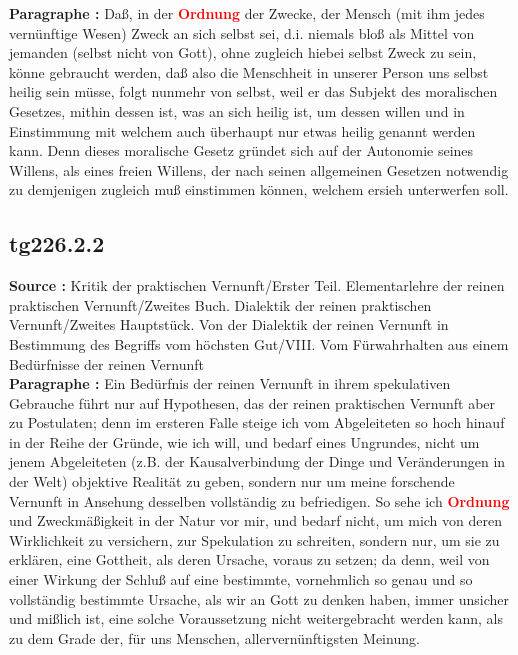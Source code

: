 \documentclass[a4paper,12pt,twoside]{book}
\newcommand{\match}[1]{\textcolor{red}{\textbf{#1}}}
\begin{document}
	\noindent\textbf{Paragraphe : }Daß, in der \match{Ordnung} der Zwecke, der Mensch (mit ihm jedes vernünftige Wesen) Zweck an sich selbst sei, d.i. niemals bloß als Mittel von jemanden (selbst nicht von Gott), ohne zugleich hiebei selbst Zweck zu sein, könne gebraucht werden, daß also die Menschheit in unserer Person uns selbst heilig sein müsse, folgt nunmehr von selbst, weil er das Subjekt des moralischen Gesetzes, mithin dessen  ist, was an sich heilig ist, um dessen willen und in Einstimmung mit welchem auch überhaupt nur etwas heilig genannt werden kann. Denn dieses moralische Gesetz gründet sich auf der Autonomie seines Willens, als eines freien Willens, der nach seinen allgemeinen Gesetzen notwendig zu demjenigen zugleich muß einstimmen können, welchem ersieh unterwerfen soll. 
	
	\subsection*{tg226.2.2} 
	\textbf{Source : }Kritik der praktischen Vernunft/Erster Teil. Elementarlehre der reinen praktischen Vernunft/Zweites Buch. Dialektik der reinen praktischen Vernunft/Zweites Hauptstück. Von der Dialektik der reinen Vernunft in Bestimmung des Begriffs vom höchsten Gut/VIII. Vom Fürwahrhalten aus einem Bedürfnisse der reinen Vernunft\\  
	
	\noindent\textbf{Paragraphe : }Ein Bedürfnis der reinen Vernunft in ihrem spekulativen Gebrauche führt nur auf Hypothesen, das der reinen praktischen Vernunft aber zu Postulaten; denn im ersteren Falle steige ich vom Abgeleiteten so hoch hinauf in der Reihe der Gründe, wie ich will, und bedarf eines Ungrundes, nicht um jenem Abgeleiteten (z.B. der Kausalverbindung der Dinge und Veränderungen in der Welt) objektive Realität zu geben, sondern nur um meine forschende Vernunft in Ansehung desselben vollständig zu befriedigen. So sehe ich \match{Ordnung} und Zweckmäßigkeit in der Natur vor mir, und bedarf nicht, um mich von deren Wirklichkeit zu versichern, zur Spekulation zu schreiten, sondern nur, um sie zu erklären, eine Gottheit, als deren Ursache, voraus zu setzen; da denn, weil von einer Wirkung der Schluß auf eine bestimmte, vornehmlich so genau und so vollständig bestimmte Ursache, als wir an Gott zu denken haben, immer unsicher und mißlich ist, eine solche Voraussetzung nicht weitergebracht werden kann, als zu dem Grade der, für uns Menschen, allervernünftigsten Meinung.
	
\end{document}
